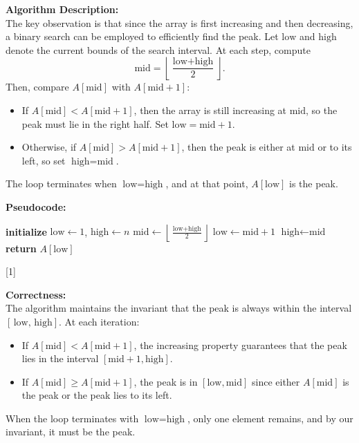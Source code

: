 \documentclass[11pt]{article}
\begin{document}
    \textbf{Algorithm Description:} \\
    The key observation is that since the array is first increasing and then decreasing, a binary search can be employed to efficiently find the peak. Let \( \text{low} \) and \( \text{high} \) denote the current bounds of the search interval. At each step, compute
    \[
    \text{mid} = \left\lfloor \frac{\text{low} + \text{high}}{2} \right\rfloor.
    \]
    Then, compare \( A[\text{mid}] \) with \( A[\text{mid}+1] \):
    \begin{itemize}
        \item If \( A[\text{mid}] < A[\text{mid}+1] \), then the array is still increasing at \( \text{mid} \), so the peak must lie in the right half. Set \( \text{low} = \text{mid} + 1 \).
        \item Otherwise, if \( A[\text{mid}] > A[\text{mid}+1] \), then the peak is either at \( \text{mid} \) or to its left, so set \( \text{high} = \text{mid} \).
    \end{itemize}
    The loop terminates when \( \text{low} = \text{high} \), and at that point, \( A[\text{low}] \) is the peak.
    
    \bigskip
    
    \textbf{Pseudocode:}
    
    \begin{algorithmic}[1]
        \State \textbf{initialize} \( \text{low} \gets 1 \), \( \text{high} \gets n \)
            \State \( \text{mid} \gets \left\lfloor \frac{\text{low} + \text{high}}{2} \right\rfloor \)
                \State \( \text{low} \gets \text{mid} + 1 \)
            \Else
                \State \( \text{high} \gets \text{mid} \)
            \EndIf
        \EndWhile
        \State \textbf{return} \( A[\text{low}] \)
    \EndProcedure
    \end{algorithmic}[1]
    
    \bigskip
    
    \textbf{Correctness:} \\
    The algorithm maintains the invariant that the peak is always within the interval \([\,\text{low},\, \text{high}]\). At each iteration:
    \begin{itemize}
        \item If \( A[\text{mid}] < A[\text{mid}+1] \), the increasing property guarantees that the peak lies in the interval \([\text{mid}+1, \text{high}]\).
        \item If \( A[\text{mid}] \geq A[\text{mid}+1] \), the peak is in \([\text{low}, \text{mid}]\) since either \( A[\text{mid}] \) is the peak or the peak lies to its left.
    \end{itemize}
    When the loop terminates with \( \text{low} = \text{high} \), only one element remains, and by our invariant, it must be the peak.
    
\end{document}
